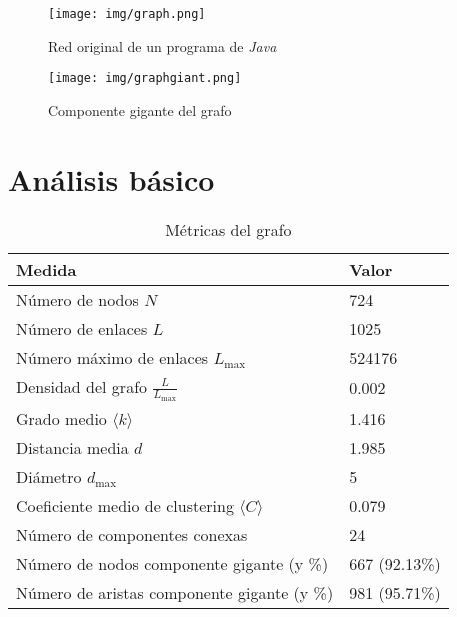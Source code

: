 \documentclass[12pt,letterpaper]{article}
\begin{document}
\begin{figure}[htp]
    \centering
    \texttt{[image: img/graph.png]}
    \caption{Red original de un programa de \textit{Java}}
    \label{fig:graph}
\end{figure}

\begin{figure}[htp]
    \centering
    \texttt{[image: img/graphgiant.png]}
    \caption{Componente gigante del grafo}
    \label{fig:graphgiant}
\end{figure}


\section{Análisis básico}

\begin{table}[h]
    \centering
    \begin{tabular}{ll}
        \toprule
        \textbf{Medida}                                         & \textbf{Valor} \\
        \midrule
        Número de nodos \( N \)                                 & 724            \\
        Número de enlaces \( L \)                               & 1025           \\
        Número máximo de enlaces \( L_{\max} \)                 & 524176         \\
        Densidad del grafo \( \frac{L}{L_{\max}} \)             & 0.002          \\
        Grado medio \( \langle k \rangle \)                     & 1.416          \\
        Distancia media \( d \)                                 & 1.985          \\
        Diámetro \( d_{\max} \)                                 & 5              \\
        Coeficiente medio de clustering \( \langle C \rangle \) & 0.079          \\
        Número de componentes conexas                           & 24             \\
        Número de nodos componente gigante (y \%)               & 667 (92.13\%)  \\
        Número de aristas componente gigante (y \%)             & 981 (95.71\%)  \\
        \bottomrule
    \end{tabular}
    \caption{Métricas del grafo}
    \label{tab:met_grafo}
\end{table}
\end{document}

